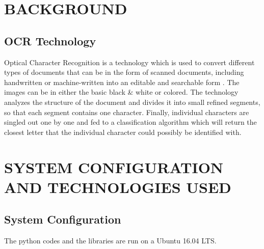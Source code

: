 \documentclass[9pt,twocolumn,twoside]{../../styles/osajnl}
\begin{document}
\section{BACKGROUND}
\subsection{OCR Technology}  
 
Optical Character Recognition is a technology which is used to convert
different types of documents that can be in the form of scanned documents,
including handwritten or machine-written into an editable and searchable
form  \cite{www-ocr}. 
The images can be in either the basic black \& white or colored.  The
technology analyzes the structure of the document and divides it
into small refined segments, so that each segment contains one character.
Finally, individual characters are singled out
one by one and fed to a classification algorithm which will return the
closest letter that the individual character could possibly be
identified with.

\section {SYSTEM CONFIGURATION AND TECHNOLOGIES USED}
\subsection{System Configuration}
The python codes and the libraries are run on a Ubuntu 16.04 LTS.
\end{document}
